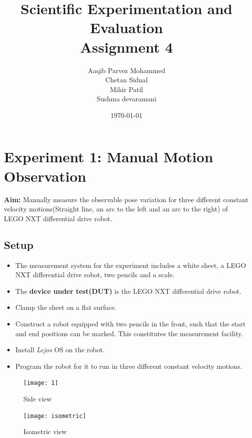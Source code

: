 \documentclass[11pt,a4paper]{article}
\begin{document}
	\title{\textbf{Scientific Experimentation and Evaluation \\ Assignment 4}}
	\author{Aaqib Parvez Mohammed \\ Chetan Sidnal\\ Mihir Patil \\ Sushma devaramani}
	\date{\today}
	\maketitle
	\newpage
	\tableofcontents
	\newpage
	\listoffigures
	\newpage
	\section{Experiment 1: Manual Motion Observation}
	\textbf{Aim:} Manually measure the observable pose variation for three different constant velocity motions(Straight line, an arc to the left and an arc to the right) of LEGO NXT differential drive robot.
	
	\subsection{\textbf{Setup}}
	\begin{itemize}
		\item The measurement system for the experiment includes a white sheet, a LEGO NXT differential drive robot, two pencils and a scale.
		\item The \textbf{device under test(DUT)} is the LEGO NXT differential drive robot.
		\item Clamp the sheet on a flat surface.
		\item Construct a robot equipped with two pencils in the front, such that the start and end positions can be marked. This constitutes the measurement facility.
		\item Install \textit{Lejos} OS on the robot.
		\item Program the robot for it to run in three different constant velocity motions.
	\end{itemize}
	
	\begin{figure}[H]
		\centering
		\centering
		\texttt{[image: 1]}
		\caption{Side view}
		\label{fig:side}
	\end{figure}
	
	\begin{figure}[H]
		\centering
		\centering
		\texttt{[image: isometric]}
		\caption{Isometric view}
		\label{fig:iso}
	\end{figure}
	
\end{document}
